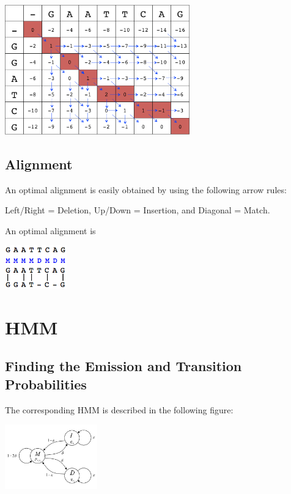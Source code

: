 \documentclass[english, a4paper,11pt]{article}
\begin{document}
\begin{center}
\includegraphics[width=0.6\textwidth]{backtracking.png}
\end{center}

\subsection{Alignment}
\noindent
An optimal alignment is easily obtained by using the following arrow rules:
\begin{center}
Left/Right = Deletion, Up/Down = Insertion, and Diagonal = Match.
\end{center}
An optimal alignment is

\begin{center}
\includegraphics[width=0.2\textwidth]{alignment.png}
\end{center}



\section{HMM}

\subsection{Finding the Emission and Transition Probabilities}
The corresponding HMM is described in the following figure:


\begin{centering}
\includegraphics[width=0.3\textwidth]{HMM.jpg}

\end{centering}
\end{document}
